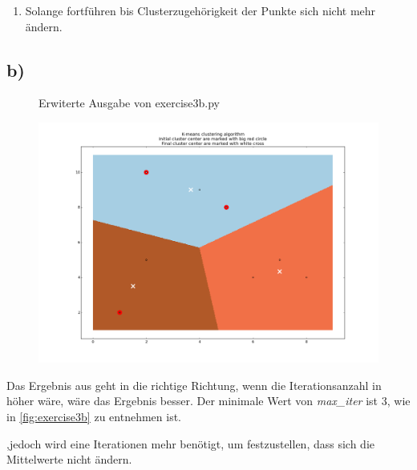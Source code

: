 \documentclass[a4paper,parskip=full-]{article}
\begin{document}
\begin{enumerate}

\item Solange fortführen bis Clusterzugehörigkeit der Punkte sich nicht mehr ändern.

\end{enumerate}

\subsection{b)}

\begin{figure}[H]
\caption{Erwiterte Ausgabe von exercise3b.py}
\label{fig:exercise3b}
\end{figure}

\begin{figure}[H]
\centering
\includegraphics[scale=0.5]{3b.png}
\end{figure}

Das Ergebnis aus  geht in die richtige Richtung, 
wenn die Iterationsanzahl in  höher wäre, wäre das Ergebnis besser.
Der minimale Wert von \textit{max\_iter} ist $3$, wie in \autoref{fig:exercise3b} zu entnehmen ist.

,jedoch wird eine Iterationen mehr benötigt, um festzustellen, dass sich die Mittelwerte nicht ändern.
\end{document}

